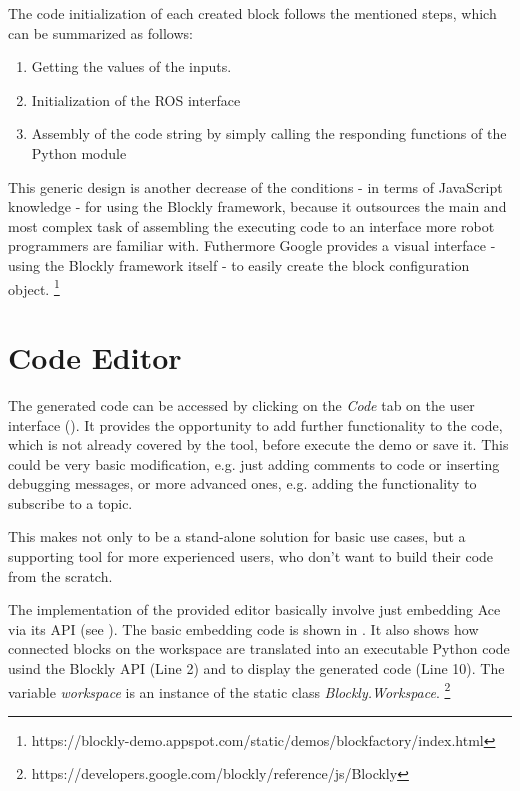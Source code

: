 The code initialization of each created block follows the mentioned steps, which can be summarized as follows:
\begin{enumerate}
	\item Getting the values of the inputs.
	\item Initialization of the ROS interface
	\item Assembly of the code string by simply calling the responding functions of the Python module
\end{enumerate}

This generic design is another decrease of the conditions - in terms of JavaScript knowledge - for using the Blockly framework, because it outsources the main and most complex task of assembling the executing code to an interface more robot programmers are familiar with. Futhermore Google provides a visual interface - using the Blockly framework itself - to easily create the block configuration object. \footnote{https://blockly-demo.appspot.com/static/demos/blockfactory/index.html}

\section{Code Editor}
The generated code can be accessed by clicking on the \textit{Code} tab on the user interface (). It provides the opportunity to add further functionality to the code, which is not already covered by the tool, before execute the demo or save it. This could be very basic modification, e.g. just adding comments to code or inserting debugging messages, or more advanced ones, e.g. adding the functionality to subscribe to a topic.

This makes \toolname{} not only to be a stand-alone solution for basic use cases, but a supporting tool for more experienced users, who don't want to build their code from the scratch.

\begin{figure}[htbp]
	
\end{figure}

The implementation of the provided editor basically involve just embedding Ace via its API (see ). The basic embedding code is shown in . It also shows how connected blocks on the workspace are translated into an executable Python code usind the Blockly API (Line 2) and to display the generated code (Line 10). The variable \textit{workspace} is an instance of the static class \textit{Blockly.Workspace}. \footnote{https://developers.google.com/blockly/reference/js/Blockly}

